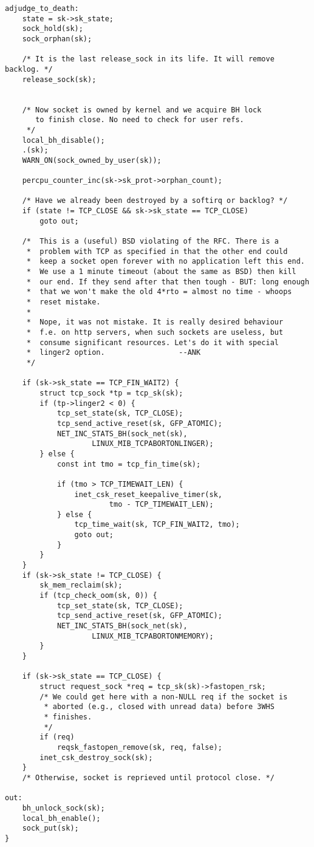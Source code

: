 \begin{verbatim}
adjudge_to_death:
    state = sk->sk_state;
    sock_hold(sk);
    sock_orphan(sk);

    /* It is the last release_sock in its life. It will remove backlog. */
    release_sock(sk);


    /* Now socket is owned by kernel and we acquire BH lock
       to finish close. No need to check for user refs.
     */
    local_bh_disable();
    .(sk);
    WARN_ON(sock_owned_by_user(sk));

    percpu_counter_inc(sk->sk_prot->orphan_count);

    /* Have we already been destroyed by a softirq or backlog? */
    if (state != TCP_CLOSE && sk->sk_state == TCP_CLOSE)
        goto out;

    /*  This is a (useful) BSD violating of the RFC. There is a
     *  problem with TCP as specified in that the other end could
     *  keep a socket open forever with no application left this end.
     *  We use a 1 minute timeout (about the same as BSD) then kill
     *  our end. If they send after that then tough - BUT: long enough
     *  that we won't make the old 4*rto = almost no time - whoops
     *  reset mistake.
     *
     *  Nope, it was not mistake. It is really desired behaviour
     *  f.e. on http servers, when such sockets are useless, but
     *  consume significant resources. Let's do it with special
     *  linger2 option.                 --ANK
     */

    if (sk->sk_state == TCP_FIN_WAIT2) {
        struct tcp_sock *tp = tcp_sk(sk);
        if (tp->linger2 < 0) {
            tcp_set_state(sk, TCP_CLOSE);
            tcp_send_active_reset(sk, GFP_ATOMIC);
            NET_INC_STATS_BH(sock_net(sk),
                    LINUX_MIB_TCPABORTONLINGER);
        } else {
            const int tmo = tcp_fin_time(sk);

            if (tmo > TCP_TIMEWAIT_LEN) {
                inet_csk_reset_keepalive_timer(sk,
                        tmo - TCP_TIMEWAIT_LEN);
            } else {
                tcp_time_wait(sk, TCP_FIN_WAIT2, tmo);
                goto out;
            }
        }
    }
    if (sk->sk_state != TCP_CLOSE) {
        sk_mem_reclaim(sk);
        if (tcp_check_oom(sk, 0)) {
            tcp_set_state(sk, TCP_CLOSE);
            tcp_send_active_reset(sk, GFP_ATOMIC);
            NET_INC_STATS_BH(sock_net(sk),
                    LINUX_MIB_TCPABORTONMEMORY);
        }
    }

    if (sk->sk_state == TCP_CLOSE) {
        struct request_sock *req = tcp_sk(sk)->fastopen_rsk;
        /* We could get here with a non-NULL req if the socket is
         * aborted (e.g., closed with unread data) before 3WHS
         * finishes.
         */
        if (req)
            reqsk_fastopen_remove(sk, req, false);
        inet_csk_destroy_sock(sk);
    }
    /* Otherwise, socket is reprieved until protocol close. */

out:
    bh_unlock_sock(sk);
    local_bh_enable();
    sock_put(sk);
}
\end{verbatim}
